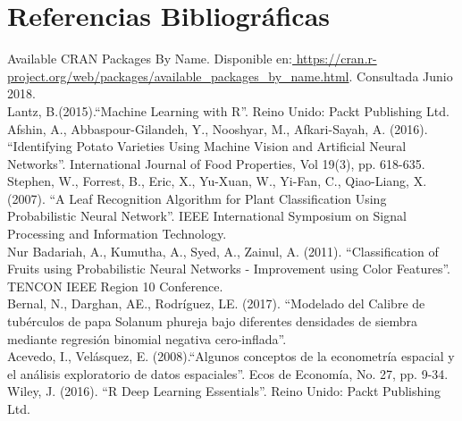 
\chapter*{Referencias Bibliográficas}

\noindent
Available CRAN Packages By Name. Disponible en:\url{ https://cran.r-project.org/web/packages/available_packages_by_name.html}. Consultada Junio 2018.\\

\noindent
Lantz, B.(2015)."`Machine Learning with R"'. Reino Unido: Packt Publishing Ltd. \\

\noindent
Afshin, A., Abbaspour-Gilandeh, Y., Nooshyar, M., Afkari-Sayah, A. (2016). "`Identifying Potato Varieties Using Machine Vision and Artificial Neural Networks"'. International Journal of Food Properties, Vol 19(3), pp. 618-635. \\

\noindent
Stephen, W., Forrest, B., Eric, X., Yu-Xuan, W., Yi-Fan, C., Qiao-Liang, X. (2007). "`A Leaf Recognition Algorithm for Plant Classification Using Probabilistic Neural Network"'. IEEE International Symposium on Signal Processing and Information Technology.\\

\noindent
Nur Badariah, A., Kumutha, A., Syed, A., Zainul, A. (2011). "`Classification of Fruits using Probabilistic Neural Networks - Improvement using Color Features"'. TENCON  IEEE Region 10 Conference.\\

\noindent
Bernal, N., Darghan, AE., Rodríguez, LE. (2017). "`Modelado del Calibre de tubérculos de papa Solanum phureja bajo diferentes densidades de siembra mediante regresión binomial negativa cero-inflada"'.\\

\noindent
Acevedo, I., Velásquez, E. (2008)."`Algunos conceptos de la econometría espacial y el análisis exploratorio de datos espaciales"'. Ecos de Economía, No. 27, pp. 9-34.\\

\noindent
Wiley, J. (2016). "`R Deep Learning Essentials"'. Reino Unido: Packt Publishing Ltd.\\

